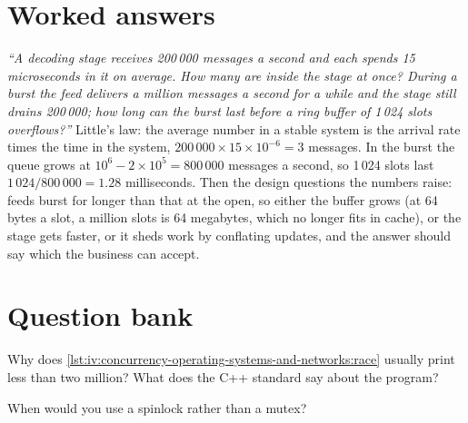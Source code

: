 \section{Worked answers}

\begin{example}\label{ex:iv:concurrency-operating-systems-and-networks:little}
\emph{``A decoding stage receives 200\,000 messages a second and each spends 15 microseconds in it on average. How many are
inside the stage at once? During a burst the feed delivers a million messages a second for a while and the stage still
drains 200\,000; how long can the burst last before a ring buffer of 1\,024 slots overflows?''} Little's law: the average
number in a stable system is the arrival rate times the time in the system, $200\,000 \times 15 \times 10^{-6} = 3$
messages. In the burst the queue grows at $10^6 - 2 \times 10^5 = 800\,000$ messages a second, so 1\,024 slots last
$1\,024/800\,000 = 1.28$ milliseconds. Then the design questions the numbers raise: feeds burst for longer than that at the
open, so either the buffer grows (at 64 bytes a slot, a million slots is 64 megabytes, which no longer fits in cache), or the
stage gets faster, or it sheds work by conflating updates, and the answer should say which the business can accept.
\end{example}

\section{Question bank}

\label{lst:iv:concurrency-operating-systems-and-networks:race}

\begin{interviewq}\label{iq:iv:concurrency-operating-systems-and-networks:1}
Why does \cref{lst:iv:concurrency-operating-systems-and-networks:race} usually print less than two million? What does the C++
standard say about the program?
\end{interviewq}

\begin{interviewq}\label{iq:iv:concurrency-operating-systems-and-networks:2}
When would you use a spinlock rather than a mutex?
\end{interviewq}

